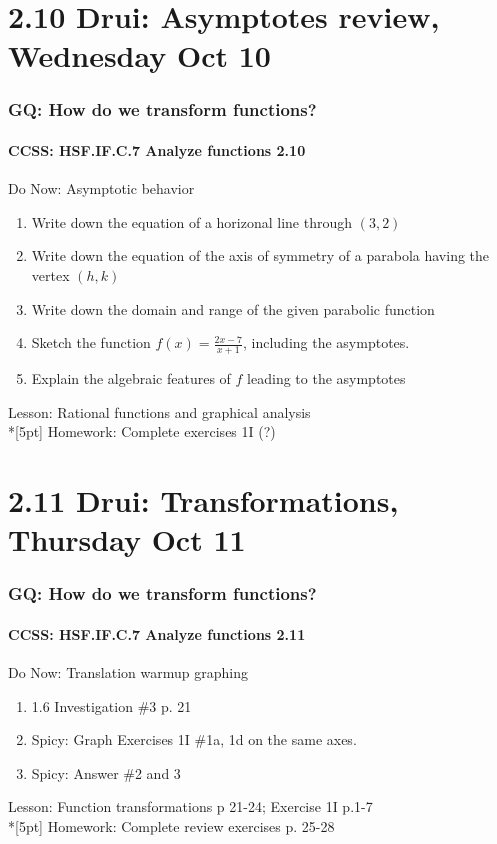 \documentclass{beamer}
\begin{document}
\section{2.10 Drui: Asymptotes review, Wednesday Oct 10}
  \frame
  {
    \frametitle{GQ: How do we transform functions?}
    \framesubtitle{CCSS: HSF.IF.C.7 Analyze functions    \alert{2.10}}

    \begin{block}{Do Now: Asymptotic behavior}
    \begin{enumerate}
        \item Write down the equation of a horizonal line through $(3,2)$
        \item Write down the equation of the axis of symmetry of a parabola having the vertex $(h,k)$
        \item Write down the domain and range of the given parabolic function
        \item Sketch the function $\displaystyle f(x)=\frac{2x-7}{x+1}$, including the asymptotes.
        \item Explain the algebraic features of $f$ leading to the asymptotes
    \end{enumerate}
    \end{block}
    Lesson: Rational functions and graphical analysis \\*[5pt]
    Homework: Complete exercises 1I (?)
  }

\section{2.11 Drui: Transformations, Thursday Oct 11}
  \frame
  {
    \frametitle{GQ: How do we transform functions?}
    \framesubtitle{CCSS: HSF.IF.C.7 Analyze functions    \alert{2.11}}

    \begin{block}{Do Now: Translation warmup graphing}
    \begin{enumerate}
        \item 1.6 Investigation \#3 p. 21
        \item Spicy: Graph Exercises 1I \#1a, 1d on the same axes.
        \item Spicy: Answer \#2 and 3
    \end{enumerate}
    \end{block}
    Lesson: Function transformations p 21-24; Exercise 1I p.1-7 \\*[5pt]
    Homework: Complete review exercises p. 25-28
  }
\end{document}
